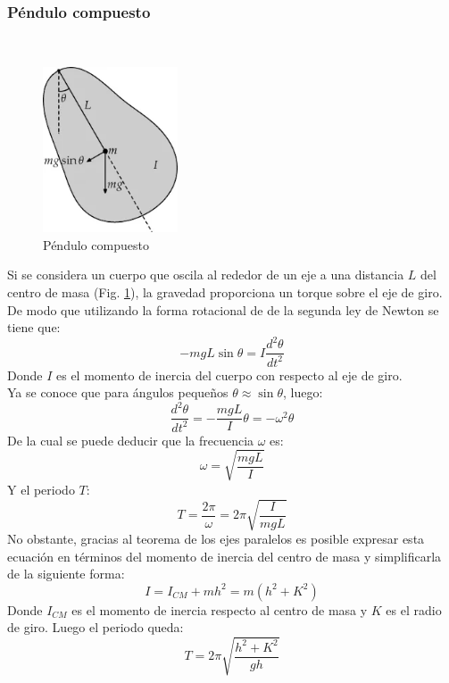 \documentclass[spanish,notitlepage,letterpaper, 12pt]{article}
\begin{document}
\subsubsection{Péndulo compuesto}
 \cite{serway_jewett_2017}\\

\begin{figure}[h]
    \centering
    \includegraphics[width=4.0cm]{images/Pendulo-compuesto.png}
    \caption{Péndulo compuesto}
    \label{Figura 2}
\end{figure}

Si se considera un cuerpo que oscila al rededor de un eje a una distancia $L$ del centro de masa (Fig. \ref{Figura 2}), la gravedad proporciona un torque sobre el eje de giro. De modo que utilizando la forma rotacional de de la segunda ley de Newton se tiene que:
\begin{equation}
    -mgL\sin{\theta}=I\frac{d^2\theta}{dt^2}
\end{equation}
Donde $I$ es el momento de inercia del cuerpo con respecto al eje de giro.\\

Ya se conoce que para ángulos pequeños $\theta\approx\sin{\theta}$, luego:
\begin{equation}
    \frac{d^2\theta}{dt^2}=-\frac{mgL}{I}\theta=-\omega^2\theta
\end{equation}
De la cual se puede deducir que la frecuencia $\omega$ es:
\begin{equation}
    \omega=\sqrt{\frac{mgL}{I}}
\end{equation}
Y el periodo $T$:
\begin{equation}
    T=\frac{2\pi}{\omega}=2\pi\sqrt{\frac{I}{mgL}}
\end{equation}
No obstante, gracias al teorema de los ejes paralelos \cite{serway_jewett_2017} es posible expresar esta ecuación en términos del momento de inercia del centro de masa y simplificarla de la siguiente forma:
\begin{equation}
    I=I_{CM}+mh^2=m(h^2+K^2)
\end{equation}
Donde $I_{CM}$ es el momento de inercia respecto al centro de masa y $K$ es el radio de giro. Luego el periodo queda:
\begin{equation}
    T=2\pi\sqrt{\frac{h^2+K^2}{gh}}
\end{equation}
\end{document}
